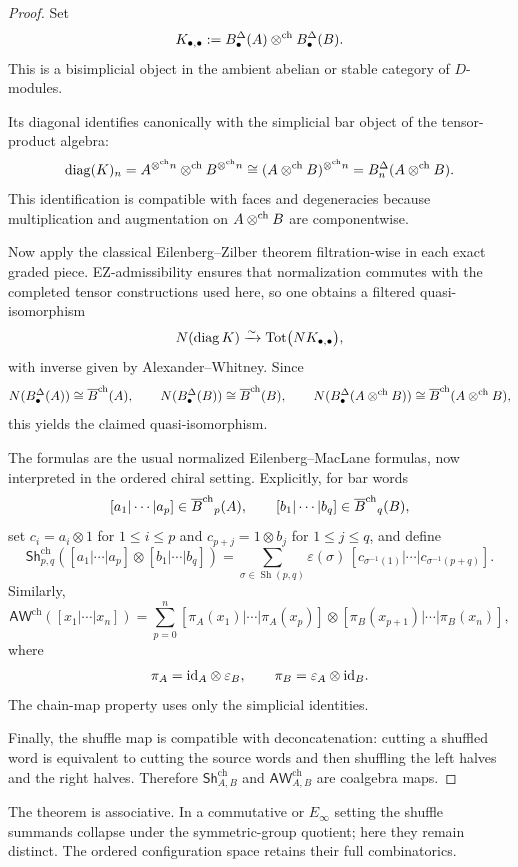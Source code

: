 \begin{proof}
Set
\[
K_{\bullet,\bullet}:=B^\Delta_\bullet(A)\mathbin{\otimes^{\mathrm{ch}}} B^\Delta_\bullet(B).
\]
This is a bisimplicial object in the ambient abelian or stable category of $D$-modules.

Its diagonal identifies canonically with the simplicial bar object of the tensor-product algebra:
\[
\operatorname{diag}(K)_n
=
A^{\mathbin{\otimes^{\mathrm{ch}}} n}\mathbin{\otimes^{\mathrm{ch}}} B^{\mathbin{\otimes^{\mathrm{ch}}} n}
\cong
(A\mathbin{\otimes^{\mathrm{ch}}} B)^{\mathbin{\otimes^{\mathrm{ch}}} n}
=
B^\Delta_n(A\mathbin{\otimes^{\mathrm{ch}}} B).
\]
This identification is compatible with faces and degeneracies because multiplication and augmentation
on $A\mathbin{\otimes^{\mathrm{ch}}} B$ are componentwise.

Now apply the classical Eilenberg--Zilber theorem filtration-wise in each exact graded piece.
EZ-admissibility ensures that normalization commutes with the completed tensor constructions used
here, so one obtains a filtered quasi-isomorphism
\[
N(\operatorname{diag}K)\xrightarrow{\sim} \operatorname{Tot}\bigl(NK_{\bullet,\bullet}\bigr),
\]
with inverse given by Alexander--Whitney. Since
\[
N(B^\Delta_\bullet(A))\cong \overline{B}^{\mathrm{ch}}(A),
\qquad
N(B^\Delta_\bullet(B))\cong \overline{B}^{\mathrm{ch}}(B),
\qquad
N(B^\Delta_\bullet(A\mathbin{\otimes^{\mathrm{ch}}} B))\cong \overline{B}^{\mathrm{ch}}(A\mathbin{\otimes^{\mathrm{ch}}} B),
\]
this yields the claimed quasi-isomorphism.

The formulas are the usual normalized Eilenberg--MacLane formulas, now interpreted in the ordered
chiral setting. Explicitly, for bar words
\[
[a_1|\cdots|a_p]\in {\overline{B}^{\mathrm{ch}}}_p(A),\qquad [b_1|\cdots|b_q]\in {\overline{B}^{\mathrm{ch}}}_q(B),
\]
set $c_i=a_i\otimes 1$ for $1\leq i\leq p$ and $c_{p+j}=1\otimes b_j$ for $1\leq j\leq q$, and define
\[
\mathsf{Sh}^{\mathrm{ch}}_{p,q}
([a_1|\cdots|a_p]\otimes[b_1|\cdots|b_q])
=
\sum_{\sigma\in \operatorname{Sh}(p,q)}
\varepsilon(\sigma)\,
[c_{\sigma^{-1}(1)}|\cdots|c_{\sigma^{-1}(p+q)}].
\]
Similarly,
\[
\mathsf{AW}^{\mathrm{ch}}([x_1|\cdots|x_n])
=
\sum_{p=0}^n
[\pi_A(x_1)|\cdots|\pi_A(x_p)]\otimes[\pi_B(x_{p+1})|\cdots|\pi_B(x_n)],
\]
where
\[
\pi_A=\mathrm{id}_A\otimes \varepsilon_B,\qquad \pi_B=\varepsilon_A\otimes \mathrm{id}_B.
\]
The chain-map property uses only the simplicial identities.

Finally, the shuffle map is compatible with deconcatenation: cutting a shuffled word is equivalent to
cutting the source words and then shuffling the left halves and the right halves. Therefore
$\mathsf{Sh}^{\mathrm{ch}}_{A,B}$ and $\mathsf{AW}^{\mathrm{ch}}_{A,B}$ are coalgebra maps.
\end{proof}

\begin{remark}
The theorem is associative. In a commutative or $E_\infty$ setting
the shuffle summands collapse under the symmetric-group quotient;
here they remain distinct. The ordered configuration space retains
their full combinatorics.
\end{remark}

